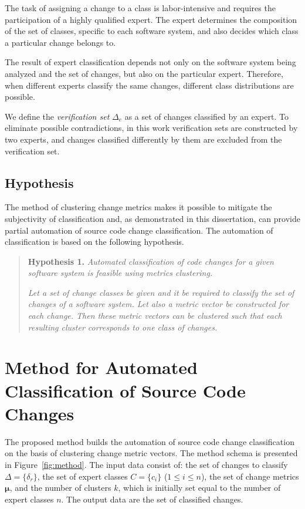\documentclass[11pt,a4paper]{article}
\begin{document}
The task of assigning a change to a class is labor-intensive and requires the participation of a highly qualified expert. The expert determines the composition of the set of classes, specific to each software system, and also decides which class a particular change belongs to.

The result of expert classification depends not only on the software system being analyzed and the set of changes, but also on the particular expert. Therefore, when different experts classify the same changes, different class distributions are possible.

We define the \textit{verification set} $\Delta_e$ as a set of changes classified by an expert. To eliminate possible contradictions, in this work verification sets are constructed by two experts, and changes classified differently by them are excluded from the verification set.

\subsection{Hypothesis}

The method of clustering change metrics makes it possible to mitigate the subjectivity of classification and, as demonstrated in this dissertation, can provide partial automation of source code change classification. The automation of classification is based on the following hypothesis.

\begin{quote}
\textbf{Hypothesis 1.} \textit{Automated classification of code changes for a given software system is feasible using metrics clustering.}

\textit{Let a set of change classes be given and it be required to classify the set of changes of a software system. Let also a metric vector be constructed for each change. Then these metric vectors can be clustered such that each resulting cluster corresponds to one class of changes.}
\end{quote}

\section{Method for Automated Classification of Source Code Changes}
\label{sec:method}

The proposed method builds the automation of source code change classification on the basis of clustering change metric vectors. The method schema is presented in Figure~\ref{fig:method}. The input data consist of: the set of changes to classify $\Delta = \{\delta_r\}$, the set of expert classes $C = \{c_i\}$ ($1 \le i \le n$), the set of change metrics $\boldsymbol{\mu}$, and the number of clusters $k$, which is initially set equal to the number of expert classes $n$. The output data are the set of classified changes.
\end{document}
